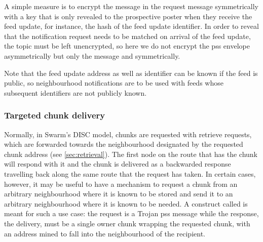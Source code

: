 A simple measure is to encrypt the message in the request  message symmetrically with a key that is only revealed to the prospective poster when they receive the feed update, for instance, the hash of the feed update identifier.
In order to reveal that the notification request needs to be matched on arrival of the feed update, the topic must be left unencrypted, so here we do not encrypt the pss envelope asymmetrically but only the message and symmetrically.

Note that the feed update address as well as identifier can be known if the feed is public, so neighbourhood notifications are to be used with feeds whose subsequent identifiers are not publicly known.

\subsubsection{Targeted chunk delivery}

Normally, in Swarm's DISC model, chunks are requested with retrieve requests, which are forwarded towards the neighbourhood designated by the requested chunk address (see \ref{sec:retrieval}). The first node on the route that has the chunk will respond with it and the chunk is delivered as a backwarded response travelling back along the same route that the request has taken. In certain cases, however, it may be useful to have a mechanism to request a chunk from an arbitrary neighbourhood where it is known to be stored and send it to an arbitrary neighbourhood where it is known to be needed. A construct called  is meant for such a use case: the request is a Trojan pss message while the response, the delivery, must be a single owner chunk wrapping the requested chunk, with an address mined to fall into the neighbourhood of the recipient.  


